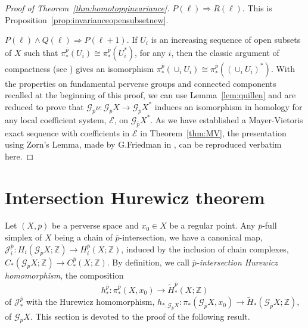 \documentclass[a4paper,10pt,english,reqno]{amsart}
\theoremstyle{plain}
\theoremstyle{definition}
\theoremstyle{remark}
\numberwithin{equation}{section}
\newcommand{\thmref}[1]{Theorem~\ref{#1}}
\newcommand{\propref}[1]{Proposition~\ref{#1}}
\newcommand{\lemref}[1]{Lemma~\ref{#1}}
\def\ov{\overline}
\def\cE{{\mathcal E}}
\def\cJ{{\mathcal J}}
\def\crG{{\mathscr G}}
\def\Z{\mathbb{Z}}
\renewcommand\1{\hbox{\ding{192}}}
\renewcommand\2{\hbox{\ding{193}}}
\newcommand\3{\hbox{\ding{194}}}
\newcommand\4{\hbox{\ding{195}}}
\begin{document}
\begin{proof}[Proof of \thmref{thm:homotopyinvariance}]
\medskip
$P(\ell) \Rightarrow R(\ell)$. This is \propref{prop:invarianceopensubsetnew}.


\medskip
$P(\ell) \wedge Q(\ell) \Rightarrow P(\ell+1)$. 
If $U_{i}$ is an increasing sequence of open subsets of $X$ such that 
$\pi_{*}^{\ov{p}}(U_{i})\cong \pi_{*}^{\ov{p}}(U_{i}^*)$, for any $i$,
then the classic argument of compactness (see \cite[Proposition 15.9]{MR0402714}) gives an isomorphism
$\pi_{*}^{\ov{p}}(\cup_{i}U_{i})\cong \pi_{*}^{\ov{p}}((\cup_{i}U_{i})^*)$.
%
With the properties on fundamental perverse groups and connected components recalled at the beginning of this proof, 
we can use \lemref{lem:quillen} and are reduced to prove that
$\crG_{\ov{p}}\nu\colon \crG_{\ov{p}}X\to \crG_{\ov{p}}X^*$ induces an isomorphism in
homology for any local coefficient system, $\cE$, on $\crG_{\ov{p}}X^*$.  
As we have established a Mayer-Vietoris exact sequence with coefficients in $\cE$ in \thmref{thm:MV}, the presentation 
using Zorn's Lemma, made by G.Friedman in \cite[Page 257]{FriedmanBook},
 can be reproduced verbatim here.
%
\end{proof}


\section{Intersection Hurewicz theorem}\label{sec:hur}
%
Let $(X,\ov{p})$ be a perverse space and $x_{0}\in X$ be a regular point.
Any $\ov{p}$-full simplex of $X$ being a chain of $\ov{p}$-intersection, we have a canonical map,
$\cJ^{\ov{p}}_{i}\colon H_{i}(\crG_{\ov{p}}X;\Z)\to H_{i}^{\ov{p}}(X;\Z)$,
induced by the inclusion of chain complexes, $C_{*}(\crG_{\ov{p}}X;\Z)\to C_{*}^{\ov{p}}(X;\Z)$.
By definition, we call \emph{$\ov{p}$-intersection Hurewicz homomorphism}, the composition
\begin{equation}\label{equa:defhur}
h^{\ov{p}}_{*}\colon \pi^{\ov{p}}_{*}(X,x_{0})\to \tilde{H}_{*}^{\ov{p}}(X;\Z)
\end{equation}
of $\cJ^{\ov{p}}_{*}$ with the Hurewicz homomorphism,  
$h_{*,\crG_{\ov{p}}X}\colon \pi_{*}(\crG_{\ov{p}}X,x_{0})\to \tilde{H}_{*}(\crG_{\ov{p}}X;\Z)$,
of $\crG_{\ov{p}}X$.
This section is devoted to the proof of the following result.
\end{document}
